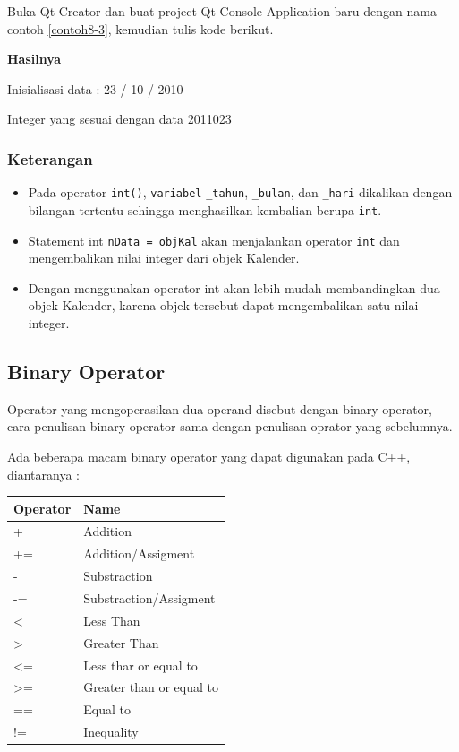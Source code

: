 Buka Qt Creator dan buat project Qt Console Application baru dengan nama
contoh \ref{contoh8-3}, kemudian tulis kode berikut.





\textbf{Hasilnya}
\begin{lcverbatim}
Inisialisasi data :
23 / 10 / 2010

Integer yang sesuai dengan data 2011023
\end{lcverbatim}


\subsubsection*{Keterangan}

\begin{itemize}

\item
 Pada operator \texttt{int()}, \texttt{variabel} \texttt{\_tahun},
 \texttt{\_bulan}, dan \texttt{\_hari} dikalikan dengan bilangan
 tertentu sehingga menghasilkan kembalian berupa \texttt{int}.
\item
 Statement int \texttt{nData\ =\ objKal} akan menjalankan operator
 \texttt{int} dan mengembalikan nilai integer dari objek Kalender.
\item
 Dengan menggunakan operator int akan lebih mudah membandingkan dua
 objek Kalender, karena objek tersebut dapat mengembalikan satu nilai
 integer.
\end{itemize}

\subsection{Binary Operator}\label{binary-operator}

Operator yang mengoperasikan dua operand disebut dengan binary operator,
cara penulisan binary operator sama dengan penulisan oprator yang
sebelumnya.



Ada beberapa macam binary operator yang dapat digunakan pada C++,
diantaranya :

\begin{longtable}[]{@{}ll@{}}
\toprule
Operator & Name\tabularnewline
\midrule
\endhead
+ & Addition\tabularnewline
+= & Addition/Assigment\tabularnewline
- & Substraction\tabularnewline
-= & Substraction/Assigment\tabularnewline
\textless{} & Less Than\tabularnewline
\textgreater{} & Greater Than\tabularnewline
\textless{}= & Less thar or equal to\tabularnewline
\textgreater{}= & Greater than or equal to\tabularnewline
== & Equal to\tabularnewline
!= & Inequality\tabularnewline
\bottomrule
\end{longtable}

